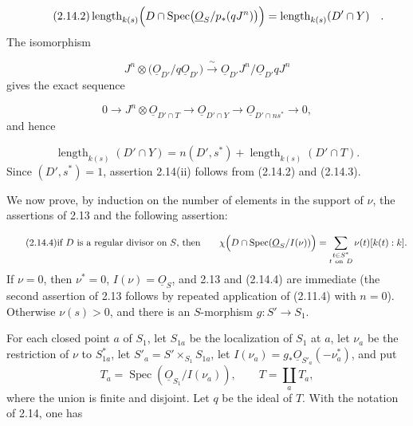 \begin{equation}\tag{2.14.2}
\operatorname{length}_{k(s)}
\Bigl(D\cap
\operatorname{Spec}\bigl(\underline{O}_S/p_*(qJ^n)\bigr)\Bigr)
=\operatorname{length}_{k(s)}(D'\cap Y) \quad .
\end{equation}
The isomorphism

\begin{equation*}
J^n\otimes
\bigl(\underline{O}_{D'}/q\underline{O}_{D'}\bigr)
\xrightarrow{\;\sim\;}
\underline{O}_{D'}J^n/
\underline{O}_{D'}qJ^n
\end{equation*}
gives the exact sequence

\begin{equation*}
0\longrightarrow
J^n\otimes\underline{O}_{D'\cap T}
\longrightarrow\underline{O}_{D'\cap Y}
\longrightarrow\underline{O}_{D'\cap ns^*}
\longrightarrow0,
\end{equation*}
and hence


\begin{equation}\tag{2.14.3}
\operatorname{length}_{k(s)}(D'\cap Y)
=n(D',s^*)+\operatorname{length}_{k(s)}(D'\cap T).
\end{equation}
Since $(D',s^*)=1$, assertion 2.14(ii) follows from (2.14.2) and (2.14.3).

We now prove, by induction on the number of elements in the support of $\nu$,
the assertions of 2.13 and the following assertion:

\begin{equation}\tag{2.14.4}
\text{if $D$ is a regular divisor on $S$, then}\qquad
\chi\Bigl(D\cap\operatorname{Spec}(\underline{O}_S/I(\nu))\Bigr)
=\sum_{\substack{t\in S^*\\t\ \mathrm{on}\ D}}
\nu(t)[k(t):k].
\end{equation}
If $\nu=0$, then $\nu^*=0$, $I(\nu)=\underline{O}_S$, and 2.13 and (2.14.4)
are immediate (the second assertion of 2.13 follows by repeated application of
(2.11.4) with $n=0$).  Otherwise $\nu(s)>0$, and there is an $S$-morphism
$g:S'\longrightarrow S_1$.

For each closed point $a$ of $S_1$, let $S_{1a}$ be the localization of $S_1$
at $a$, let $\nu_a$ be the restriction of $\nu$ to $S_{1a}^*$, let
$S'_a=S'\times_{S_1}S_{1a}$, let
$I(\nu_a)=g_*\underline{O}_{S'_a}(-\nu_a^*)$, and put
\[
T_a=\operatorname{Spec}(\underline{O}_{S_1}/I(\nu_a)),\qquad
T=\coprod_aT_a,
\]
where the union is finite and disjoint.  Let $q$ be the ideal of $T$.  With the
notation of 2.14, one has

